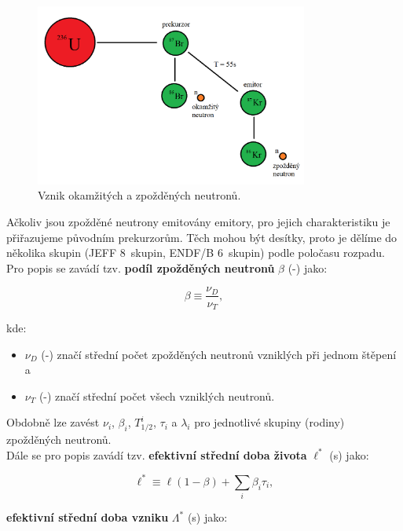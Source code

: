 \begin{figure}[H]
  \centering
  \includegraphics[width=0.8\textwidth]{img/1.png}
  \caption{Vznik okamžitých a zpožděných neutronů.}
  \label{fig_zpozdenky}
\end{figure}

Ačkoliv jsou zpožděné neutrony emitovány emitory, pro jejich charakteristiku je přiřazujeme původním prekurzorům. Těch mohou být desítky, proto je dělíme do několika skupin (JEFF 8~skupin, ENDF/B 6~skupin) podle poločasu rozpadu. Pro popis se zavádí tzv. \textbf{podíl zpožděných neutronů} $\beta$ (-) jako:

\begin{equation}
  \boxed{
  \beta \equiv \dfrac{\nu_D}{\nu_T},
  \label{zpozdenky}}
\end{equation}

kde:

\begin{itemize}
  \item $\nu_D$ (-) značí střední počet zpožděných neutronů vzniklých při jednom štěpení a
  \item $\nu_T$ (-) značí střední počet všech vzniklých neutronů.
\end{itemize}

Obdobně lze zavést $\nu_i$, $\beta_i$, $T_{1/2}^i$, $\tau_i$ a $\lambda_i$ pro jednotlivé skupiny (rodiny) zpožděných neutronů.\\

Dále se pro popis zavádí tzv. \textbf{efektivní střední doba života} $\ell^*$ (s) jako:

\begin{equation}
  \boxed{
  \ell^* \equiv \ell(1-\beta) + \sum_i \beta_i \tau_i,
  \label{efektivni_stredni_doba_zivota}}
\end{equation}

\textbf{efektivní střední doba vzniku} $\Lambda^*$ (s) jako:

